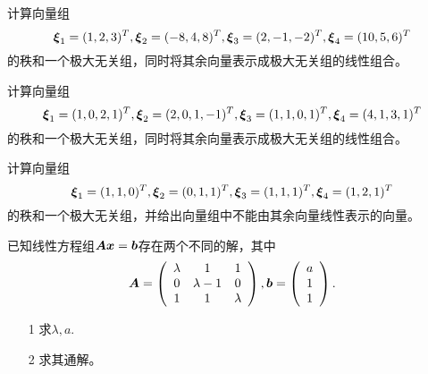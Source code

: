 \begin{frame}\ft{\subsecname}
  
  \begin{li}[2007-2008第二学期]
    计算向量组
    $$\boldsymbol{\xi}_1=(1,2,3)^T,\boldsymbol{\xi}_2=(-8,4,8)^T,\boldsymbol{\xi}_3=(2,-1,-2)^T,
    \boldsymbol{\xi}_4=(10,5,6)^T
    $$的秩和一个极大无关组，同时将其余向量表示成极大无关组的线性组合。
  \end{li}
  
\end{frame}



\begin{frame}\ft{\subsecname}
  
  \begin{li}[2008-2009第一学期]
    计算向量组
    $$\boldsymbol{\xi}_1=(1,0,2,1)^T,\boldsymbol{\xi}_2=(2,0,1,-1)^T,\boldsymbol{\xi}_3=(1,1,0,1)^T,
    \boldsymbol{\xi}_4=(4,1,3,1)^T
    $$的秩和一个极大无关组，同时将其余向量表示成极大无关组的线性组合。
  \end{li}
  
\end{frame}




\begin{frame}\ft{\subsecname}
  
  \begin{li}[2008-2009第一学期]
    计算向量组$$\boldsymbol{\xi}_1=(1,1,0)^T,\boldsymbol{\xi}_2=(0,1,1)^T,\boldsymbol{\xi}_3=(1,1,1)^T,
    \boldsymbol{\xi}_4=(1,2,1)^T$$的秩和一个极大无关组，并给出向量组中不能由其余向量线性表示的向量。
  \end{li}
  
\end{frame}


\begin{frame}\ft{\subsecname}
  
  \begin{li}[2009-2010第一学期]
    已知线性方程组$\boldsymbol{A}{\boldsymbol{x}}={\boldsymbol{b}}$存在两个不同的解，其中$$\boldsymbol{A}=\left(
      \begin{array}{ccc}
        \lambda&1&1\\
        0&\lambda-1&0\\
        1&1&\lambda
      \end{array}
    \right),{\boldsymbol{b}}=\left(
      \begin{array}{c}
        a\\1 \\1
      \end{array}
    \right).$$
    \begin{itemize}
    \item[1] 求$\lambda,a$.
    \item[2] 求其通解。
    \end{itemize}
  \end{li}

  
\end{frame}


